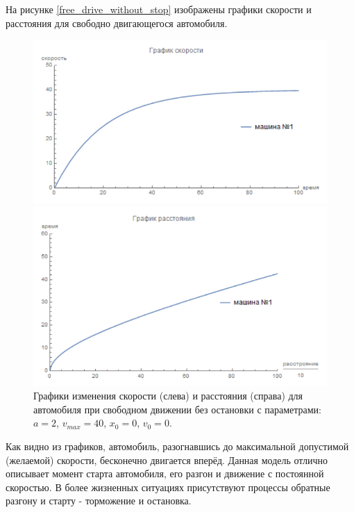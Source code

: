 \documentclass[12pt, a4paper]{extarticle}
\numberwithin{equation}{section}
\begin{document}
На рисунке \eqref{free_drive_without_stop} изображены графики скорости и расстояния для свободно двигающегося автомобиля.
\begin{figure}[h!]
	\begin{center}
		\begin{minipage}[h!]{0.48\linewidth}
			\includegraphics[width=1\linewidth,height=0.2\textheight]
			{Images/free_drive_speed.png}
		\end{minipage}
		\hfill 
		\begin{minipage}[h!]{0.48\linewidth}
			\includegraphics[width=1\linewidth,height=0.2\textheight]
			{Images/free_drive_distance.png}
		\end{minipage}
		\caption{Графики изменения скорости (слева) и расстояния (справа) для автомобиля при свободном движении без остановки с параметрами: $a=2$, $v_{max}=40$, $x_0=0$, $v_0=0$.}
		\label{free_drive_without_stop}
	\end{center}
\end{figure}

Как видно из графиков, автомобиль, разогнавшись до максимальной допустимой (желаемой) скорости, бесконечно двигается вперёд. Данная модель отлично описывает момент старта автомобиля, его разгон и движение с постоянной скоростью. В более жизненных ситуациях присутствуют процессы обратные разгону и старту - торможение и остановка.
\end{document}
